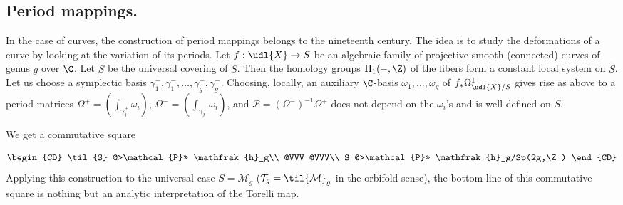 \subsection{Period mappings.}\label{sub:1.2} 

\begin{para}\label{para:1.2.1}
 In the case of curves, the construction of period mappings belongs to
 the nineteenth
 century. The idea is to study the deformations of a curve by looking at
 the variation of its periods.  Let $f:{\udl{X}}\rightarrow S$ be an
 algebraic family of projective smooth (connected) curves of genus $g$
 over $\C$. Let $\tilde S$ be the universal covering of $S$. Then the
 homology groups $\mathrm{H}_1(-,{\Z})$ of the fibers form a constant
 local system on $\tilde S$. Let us choose a symplectic basis
 $\gamma_1^+,\gamma_1^-,\ldots ,\gamma_g^+, \gamma_g^-$. Choosing,
 locally, an auxiliary $\C$-basis $\omega_1,\ldots,\omega_g$ of
 $f_\ast\Omega^1_{\udl{X} /S}$ gives rise as above to a period matrices
 $\Omega^+=(\int_{\gamma^+_j}\omega_i)$, 
 $\Omega^-=(\int_{\gamma^-_j}\omega_i)$,  
 and $\mathcal{P}=(\Omega^-)^{-1}\Omega^+$ does not depend on the
 $\omega_i$'s and is well-defined on $\tilde S$.


 We get a commutative square 

 \begin{equation*}
  \begin{CD}
   \til{S} @>\mathcal{P}>> \mathfrak{h}_g\\
   @VVV @VVV\\
   S @>\mathcal{P}>> \mathfrak{h}_g/Sp(2g,\Z)
  \end{CD}
 \end{equation*}
 Applying this construction to the universal case
 $S=\mathcal{M}_g$ ($\mathcal{T}_g=\til{\mathcal{M}}_g$ in the orbifold
 sense), the bottom line of this commutative square is nothing but an
 analytic interpretation of the Torelli map.
\end{para}

